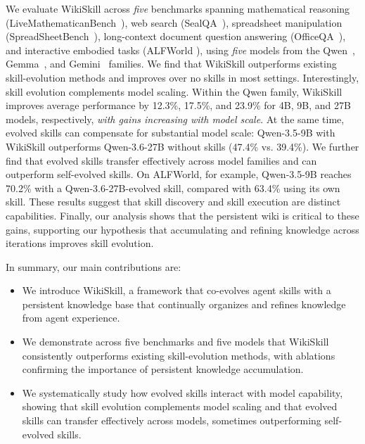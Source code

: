 \documentclass[11pt, a4paper, copyright, gr]{google}
\newcommand{\method}{WikiSkill\xspace}
\begin{document}
We evaluate \method across \emph{five} benchmarks spanning mathematical reasoning (LiveMathematicanBench~\citep{he2026livemathematicianbench}), web search (SealQA~\citep{pham2026sealqa}), spreadsheet manipulation (SpreadSheetBench~\citep{ma2024spreadsheetbench}), long-context document question answering (OfficeQA~\citep{singhvi2025officeqa}), and interactive embodied tasks (ALFWorld \citep{shridhar2021alfworld}), using \emph{five} models from the Qwen~\citep{qwen2026qwen35,qwen2026qwen36}, Gemma~\citep{team2026gemma}, and Gemini~\citep{googledeepmind2026gemini35flash} families. We find that \method outperforms existing skill-evolution methods and improves over no skills in most settings. Interestingly, skill evolution complements model scaling. Within the Qwen family, \method improves average performance by 12.3\%, 17.5\%, and 23.9\% for 4B, 9B, and 27B models, respectively, \emph{with gains increasing with model scale}. At the same time, evolved skills can compensate for substantial model scale: Qwen-3.5-9B with \method outperforms Qwen-3.6-27B without skills (47.4\% vs. 39.4\%). We further find that evolved skills transfer effectively across model families and can outperform self-evolved skills. On ALFWorld, for example, Qwen-3.5-9B reaches 70.2\% with a Qwen-3.6-27B-evolved skill, compared with 63.4\% using its own skill. These results suggest that skill discovery and skill execution are distinct capabilities. Finally, our analysis shows that the persistent wiki is critical to these gains, supporting our hypothesis that accumulating and refining knowledge across iterations improves skill evolution. 


In summary, our main contributions are: 
\begin{itemize}
    \item We introduce \method, a framework that co-evolves agent skills with a persistent knowledge base that continually organizes and refines knowledge from agent experience.
    \item We demonstrate across five benchmarks and five models that \method consistently outperforms existing skill-evolution methods, with ablations confirming the importance of persistent knowledge accumulation.
    \item We systematically study how evolved skills interact with model capability, showing that skill evolution complements model scaling and that evolved skills can transfer effectively across models, sometimes outperforming self-evolved skills.
\end{itemize}
\end{document}
